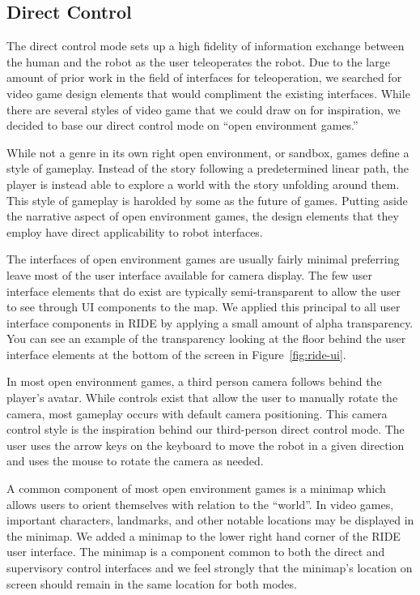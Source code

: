 \subsection{Direct Control}

The direct control mode sets up a high fidelity of information exchange between the human and the robot as the user teleoperates the robot. Due to the large amount of prior work in the field of interfaces for teleoperation, we searched for video game design elements that would compliment the existing interfaces. While there are several styles of video game that we could draw on for inspiration, we decided to base our direct control mode on ``open environment games.''

While not a genre in its own right open environment, or sandbox, games define a style of gameplay. Instead of the story following a predetermined linear path, the player is instead able to explore a world with the story unfolding around them. This style of gameplay is harolded by some as the future of games. Putting aside the narrative aspect of open environment games, the design elements that they employ have direct applicability to robot interfaces.


The interfaces of open environment games are usually fairly minimal preferring leave most of the user interface available for camera display. The few user interface elements that do exist are typically semi-transparent to allow the user to see through UI components to the map. We applied this principal to all user interface components in RIDE by applying a small amount of alpha transparency. You can see an example of the transparency looking at the floor behind the user interface elements at the bottom of the screen in Figure~\ref{fig:ride-ui}.

In most open environment games, a third person camera follows behind the player's avatar. While controls exist that allow the user to manually rotate the camera, most gameplay occurs with default camera positioning. This camera control style is the inspiration behind our third-person direct control mode. The user uses the arrow keys on the keyboard to move the robot in a given direction and uses the mouse to rotate the camera as needed.

A common component of most open environment games is a minimap which allows users to orient themselves with relation to the ``world''. In video games, important characters, landmarks, and other notable locations may be displayed in the minimap. We added a minimap to the lower right hand corner of the RIDE user interface. The minimap is a component common to both the direct and supervisory control interfaces and we feel strongly that the minimap's location on screen should remain in the same location for both modes.

